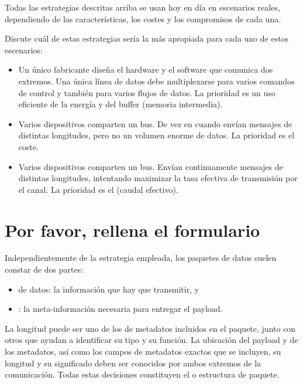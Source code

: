 \begin{exercise}
Todas las estrategias descritas arriba se usan hoy en día en escenarios reales, dependiendo de las 
características, los costes y los compromisos de cada una.

Discute cuál de estas estrategias sería la más apropiada para cada uno de estos escenarios:
\begin{itemize}
\item Un único fabricante diseña el hardware y el software que comunica dos extremos.
Una única línea de datos debe multiplexarse para varios comandos de control
y también para varios flujos de datos. La prioridad es un uso eficiente de la energía y del buffer (memoria intermedia).

\item Varios dispositivos comparten un bus. De vez en cuando envían mensajes de distintas longitudes,
pero no un volumen enorme de datos. La prioridad es el coste.

\item Varios dispositivos comparten un bus. Envían continuamente mensajes de distintas longitudes,
intentando maximizar la tasa efectiva de transmisión por el canal. 
La prioridad es el  (caudal efectivo).
\end{itemize}
\end{exercise}

\section{Por favor, rellena el formulario}\label{sec:packets:format}

Independientemente de la estrategia empleada, los paquetes de datos suelen constar de dos partes: 
\begin{itemize}
 \item {} de datos: la información que hay que transmitir, y
 \item {}: la meta-información necesaria para entregar el payload.
\end{itemize}
La longitud puede ser uno de los  de metadatos incluidos en el paquete, junto con 
otros que ayudan a identificar su tipo y su función.
% 
La ubicación del payload y de los metadatos, así como los campos de metadatos exactos que se incluyen, su longitud y su significado
deben ser conocidos por ambos extremos de la comunicación. Todas estas decisiones constituyen el 
o estructura de paquete.

